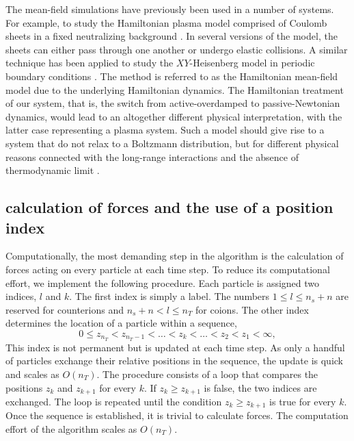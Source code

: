 \documentclass[pre,twocolumn,graphicx]{revtex4-1}
\newcommand{\be}{\begin{equation}}
\newcommand{\ee}{\end{equation}}
\begin{document}
The mean-field simulations have previously been used in a number of systems.  
For example, to study the Hamiltonian plasma model comprised of 
Coulomb sheets in a fixed neutralizing background \cite{Dawson62}.  In several versions of the model,
the sheets can either pass through one another or undergo elastic collisions.  A similar technique 
has been applied to study the $XY$-Heisenberg model in periodic boundary conditions 
\cite{Antoni95}.  The method is referred to as the Hamiltonian mean-field model due to the 
underlying Hamiltonian dynamics.  
The Hamiltonian treatment of our system, that is, the switch from active-overdamped to passive-Newtonian dynamics,
would lead to an altogether different physical interpretation, with the latter case representing 
a plasma system.  Such a model should give rise to a system that do not relax to a Boltzmann 
distribution, but for different physical reasons connected with the long-range
interactions and the absence of thermodynamic limit \cite{Yan14}.  



\subsection{calculation of forces and the use of a position index}

Computationally, the most demanding step in the algorithm is the calculation of forces acting on every 
particle at each time step.  
To reduce its computational effort, we implement the following procedure.  
Each particle is assigned two indices, $l$ and $k$.  The first index is simply a label.  
The numbers $1\le l\le n_s+n$ are reserved for counterions 
and $n_s+n < l \le n_T$ for coions.  The other index determines the location of a particle within a sequence, 
\be
0\le z_{n_T} < z_{n_T-1} < \dots < z_k < \dots < z_2 < z_1 < \infty, 
\ee
This index is not permanent but is updated at each time step.  As only a handful of particles exchange their 
relative positions in the sequence, the update is quick and scales as $O(n_T)$.  The procedure consists of a 
loop that compares the positions $z_k$ and $z_{k+1}$ for every $k$.    
If $z_k\ge z_{k+1}$ is false, the two indices are exchanged.  The loop is repeated until the condition
$z_k\ge z_{k+1}$ is true for every $k$.   Once the sequence is established, it is trivial to calculate forces.  
The computation effort of the algorithm scales as $O(n_T)$.  
\end{document}
